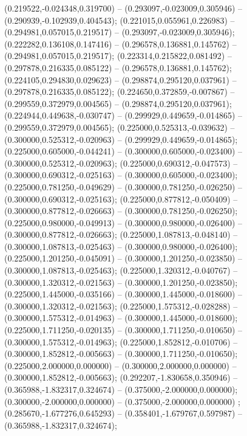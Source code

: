  (0.219522,-0.024348,0.319700) -- (0.293097,-0.023009,0.305946) -- (0.290939,-0.102939,0.404543);
 (0.221015,0.055961,0.226983) -- (0.294981,0.057015,0.219517) -- (0.293097,-0.023009,0.305946);
 (0.222282,0.136108,0.147416) -- (0.296578,0.136881,0.145762) -- (0.294981,0.057015,0.219517);
 (0.223314,0.215822,0.081492) -- (0.297878,0.216335,0.085122) -- (0.296578,0.136881,0.145762);
 (0.224105,0.294830,0.029623) -- (0.298874,0.295120,0.037961) -- (0.297878,0.216335,0.085122);
 (0.224650,0.372859,-0.007867) -- (0.299559,0.372979,0.004565) -- (0.298874,0.295120,0.037961);
 (0.224944,0.449638,-0.030747) -- (0.299929,0.449659,-0.014865) -- (0.299559,0.372979,0.004565);
 (0.225000,0.525313,-0.039632) -- (0.300000,0.525312,-0.020963) -- (0.299929,0.449659,-0.014865);
 (0.225000,0.605000,-0.044241) -- (0.300000,0.605000,-0.023400) -- (0.300000,0.525312,-0.020963);
 (0.225000,0.690312,-0.047573) -- (0.300000,0.690312,-0.025163) -- (0.300000,0.605000,-0.023400);
 (0.225000,0.781250,-0.049629) -- (0.300000,0.781250,-0.026250) -- (0.300000,0.690312,-0.025163);
 (0.225000,0.877812,-0.050409) -- (0.300000,0.877812,-0.026663) -- (0.300000,0.781250,-0.026250);
 (0.225000,0.980000,-0.049913) -- (0.300000,0.980000,-0.026400) -- (0.300000,0.877812,-0.026663);
 (0.225000,1.087813,-0.048140) -- (0.300000,1.087813,-0.025463) -- (0.300000,0.980000,-0.026400);
 (0.225000,1.201250,-0.045091) -- (0.300000,1.201250,-0.023850) -- (0.300000,1.087813,-0.025463);
 (0.225000,1.320312,-0.040767) -- (0.300000,1.320312,-0.021563) -- (0.300000,1.201250,-0.023850);
 (0.225000,1.445000,-0.035166) -- (0.300000,1.445000,-0.018600) -- (0.300000,1.320312,-0.021563);
 (0.225000,1.575312,-0.028288) -- (0.300000,1.575312,-0.014963) -- (0.300000,1.445000,-0.018600);
 (0.225000,1.711250,-0.020135) -- (0.300000,1.711250,-0.010650) -- (0.300000,1.575312,-0.014963);
 (0.225000,1.852812,-0.010706) -- (0.300000,1.852812,-0.005663) -- (0.300000,1.711250,-0.010650);
 (0.225000,2.000000,0.000000) -- (0.300000,2.000000,0.000000) -- (0.300000,1.852812,-0.005663);
 (0.292207,-1.830658,0.350946) -- (0.365988,-1.832317,0.324674) -- (0.375000,-2.000000,0.000000);
 (0.300000,-2.000000,0.000000) -- (0.375000,-2.000000,0.000000) ;
 (0.285670,-1.677276,0.645293) -- (0.358401,-1.679767,0.597987) -- (0.365988,-1.832317,0.324674);
